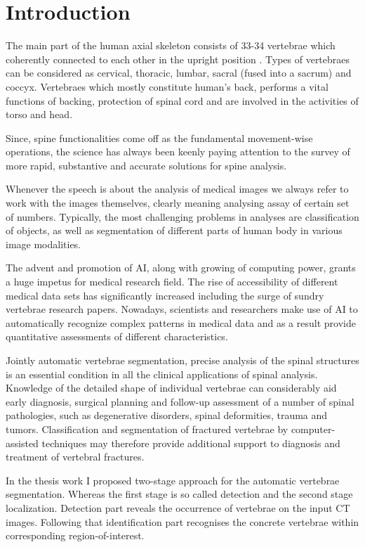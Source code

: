 \chapter{Introduction}
\label{ch:introduction}


The main part of the human axial skeleton consists of 33-34 vertebrae which coherently connected to each other in the upright position \cite{Ahlberg2005}. Types of vertebraes can be considered as cervical, thoracic, lumbar, sacral (fused into a sacrum) and coccyx. Vertebraes which mostly constitute human's back, performs a vital functions of backing, protection of spinal cord and are involved in the activities of torso and head.

Since, spine functionalities come off as the fundamental movement-wise operations, the science has always been keenly paying attention to the survey of more rapid, substantive and accurate solutions for spine analysis.
 
Whenever the speech is about the analysis of medical images we always refer to work with the images themselves, clearly meaning analysing assay of certain set of numbers. Typically, the most challenging problems in analyses are classification of objects, as well as segmentation of different parts of human body in various image modalities.  
 
The advent and promotion of AI, along with growing of computing power, \cite{Pham2000} grants a huge impetus for medical research field. The rise of accessibility of different medical data sets has significantly increased including the surge of sundry vertebrae research papers. Nowadays, scientists and researchers make use of AI to automatically recognize complex patterns in medical data and as a result provide quantitative assessments of different characteristics.  
 
Jointly automatic vertebrae segmentation, precise analysis of the spinal structures is an essential condition in all the clinical applications of spinal analysis. Knowledge of the detailed shape of individual vertebrae can considerably aid early diagnosis, surgical planning and follow-up assessment of a number of spinal pathologies, such as degenerative disorders, spinal deformities, trauma and tumors. Classification and segmentation of fractured vertebrae by computer-assisted techniques may therefore provide additional support to diagnosis and treatment of vertebral fractures. 

In the thesis work I proposed two-stage approach for the automatic vertebrae segmentation. Whereas the first stage is so called detection and the second stage localization. 
Detection part reveals the occurrence of vertebrae on the input CT images. Following that identification part recognises the concrete vertebrae within corresponding region-of-interest.